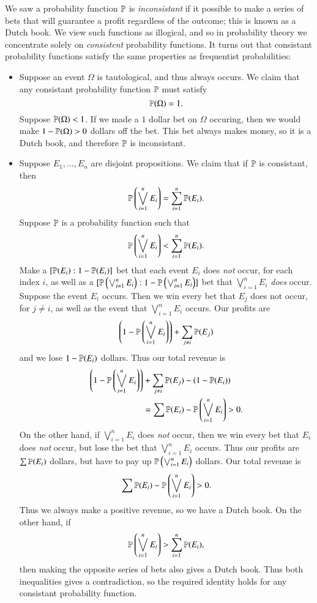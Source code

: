 We saw a probability function $\mathbb{P}$ is \emph{inconsistant} if it possible to make a series of bets that will guarantee a profit regardless of the outcome; this is known as a Dutch book. We view such functions as illogical, and so in probability theory we concentrate solely on \emph{consistent} probability functions. It turns out that consistant probability functions satisfy the same properties as frequentist probabilities:
%
\begin{itemize}
    \item Suppose an event $\Omega$ is tautological, and thus always occurs. We claim that any consistant probability function $\mathbb{P}$ must satisfy
    \[ \mathbb{P}(\Omega) = 1. \]
    Suppose $\mathbb{P}(\Omega) < 1$. If we made a $1$ dollar bet on $\Omega$ occuring, then we would make $1 - \mathbb{P}(\Omega) > 0$ dollars off the bet. This bet always makes money, so it is a Dutch book, and therefore $\mathbb{P}$ is inconsistant.

    \item Suppose $E_1, \dots, E_n$ are disjoint propositions. We claim that if $\mathbb{P}$ is consistant, then
    \[ \mathbb{P} \left( \bigvee_{i = 1}^n E_i \right) = \sum_{i = 1}^n \mathbb{P}(E_i). \]
    Suppose $\mathbb{P}$ is a probability function such that
    \[ \mathbb{P} \left( \bigvee_{i = 1}^n E_i \right) < \sum_{i = 1}^n \mathbb{P}(E_i). \]
    Make a $[\mathbb{P}(E_i): 1 - \mathbb{P}(E_i)]$ bet that each event $E_i$ does \emph{not} occur, for each index $i$, as well as a $[\mathbb{P} \left( \bigvee_{i = 1}^n E_i \right) : 1 - \mathbb{P} \left( \bigvee_{i = 1}^n E_i \right)]$ bet that $\bigvee_{i = 1}^n E_i$ \emph{does} occur. Suppose the event $E_i$ occurs. Then we win every bet that $E_j$ does not occur, for $j \neq i$, as well as the event that $\bigvee_{i = 1}^n E_i$ occurs. Our profits are
    \[ \left( 1 - \mathbb{P} \left( \bigvee_{i = 1}^n E_i \right) \right) + \sum_{j \neq i} \mathbb{P}(E_j) \]
    and we lose $1 - \mathbb{P}(E_i)$ dollars. Thus our total revenue is
    \begin{align*}
        \left( 1 - \mathbb{P} \left( \bigvee_{i = 1}^n E_i \right) \right)& + \sum_{j \neq i} \mathbb{P}(E_j) - \left( 1 - \mathbb{P}(E_i) \right)\\
        &= \sum \mathbb{P}(E_i) - \mathbb{P} \left( \bigvee_{i = 1}^n E_i \right) > 0.
    \end{align*}
    On the other hand, if $\bigvee_{i = 1}^n E_i$ does \emph{not} occur, then we win every bet that $E_i$ does \emph{not} occur, but lose the bet that $\bigvee_{i = 1}^n E_i$ occurs. Thus our profits are $\sum \mathbb{P}(E_i)$ dollars, but have to pay up $\mathbb{P} \left( \bigvee_{i = 1}^n E_i \right)$ dollars. Our total revenue is
    \[ \sum \mathbb{P}(E_i) - \mathbb{P} \left( \bigvee_{i = 1}^n E_i \right) > 0. \]
    Thus we always make a positive revenue, so we have a Dutch book. On the other hand, if
    \[ \mathbb{P} \left( \bigvee_{i = 1}^n E_i \right) > \sum_{i = 1}^n \mathbb{P}(E_i), \]
    then making the opposite series of bets also gives a Dutch book. Thus both inequalities gives a contradiction, so the required identity holds for any consistant probability function.
\end{itemize}
